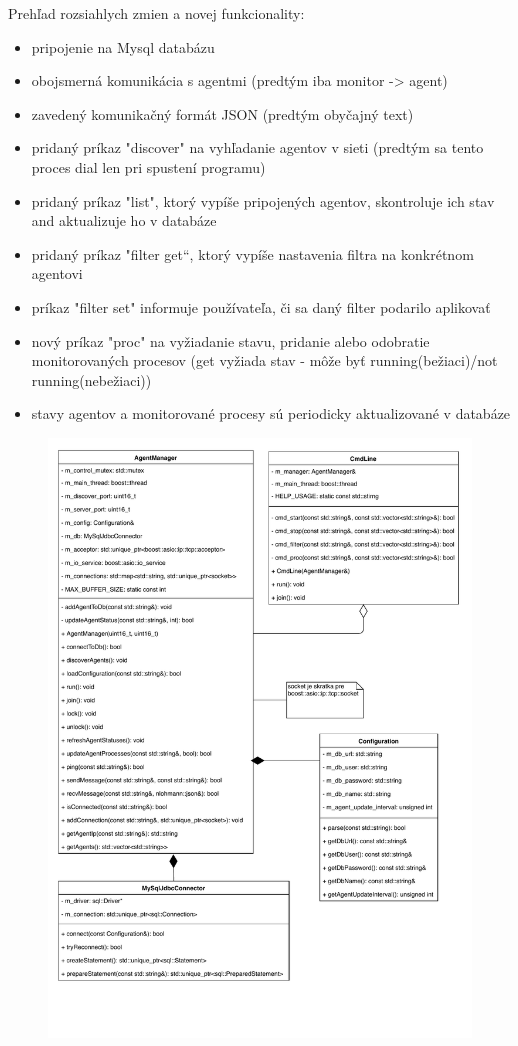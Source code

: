 \documentclass[a4paper,12pt]{article}
\begin{document}
\noindent Prehľad rozsiahlych zmien a novej funkcionality:
\begin{itemize} 
	\item pripojenie na Mysql databázu
	\item obojsmerná komunikácia s agentmi (predtým iba monitor -> agent)
	\item zavedený komunikačný formát JSON (predtým obyčajný text)
	\item pridaný príkaz "discover" na vyhľadanie agentov v sieti (predtým sa tento proces dial len pri spustení programu)
	\item pridaný príkaz "list", ktorý vypíše pripojených agentov, skontroluje ich stav and aktualizuje ho v databáze
	\item pridaný príkaz "filter get“, ktorý vypíše nastavenia filtra na konkrétnom agentovi
	\item príkaz "filter set" informuje používateľa, či sa daný filter podarilo aplikovať
	\item nový príkaz "proc" na vyžiadanie stavu, pridanie alebo odobratie monitorovaných procesov (get vyžiada stav - môže byť running(bežiaci)/not running(nebežiaci)) 
	\item stavy agentov a monitorované procesy sú periodicky aktualizované v databáze \\
\end{itemize}
\newpage
\begin{figure}[h!]
	\centering
	\includegraphics[scale=0.75]{monitor.pdf}
\end{figure}
\end{document}
